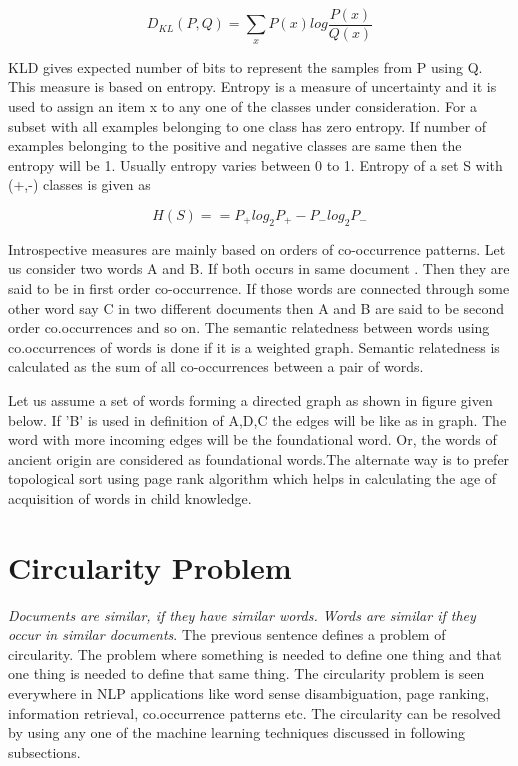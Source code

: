 \documentclass{bmcart}
\begin{document}
\begin{center}
\begin{equation}
D_{KL}(P,Q) = \sum_{x}P(x)log \frac{P(x)}{Q(x)} 
\end{equation}
\end{center}

KLD gives expected number of bits to represent the samples from P using Q. This measure is based on entropy. Entropy is a measure of uncertainty and it is used to assign an item x to any one of the classes under consideration. For a subset with all examples belonging to one class has zero entropy. If number of examples belonging  to the positive and negative classes are same then the entropy will be 1. Usually entropy varies between 0 to 1. Entropy of a set S with (+,-) classes is given as

\begin{center}
\begin{equation}
H(S)==P_{+}log_2P_{+} - P_{-}log_2P_{-}
\end{equation}
\label{eqn:entropy}
\end{center}

Introspective measures are mainly based on orders of co-occurrence patterns. 
Let us consider two words A and B. If both occurs in same document . Then they are said to be in first order co-occurrence. If those words are connected through some other word say C in two different documents then A and B are said to be second order co.occurrences and so on. The semantic relatedness between words using co.occurrences of words is done if it is a weighted graph. Semantic relatedness is calculated as the sum of all co-occurrences between a pair of words. 

Let us assume a set of words forming a directed graph as shown in figure given below. If 'B' is used in definition of A,D,C the edges will be like as in graph. The word with more incoming edges will be the foundational word. Or, the words of ancient origin are considered as foundational words.The alternate way is to prefer topological sort using page rank algorithm which helps in calculating the age of acquisition of words in child knowledge. 

\section{Circularity Problem}
\label{sec:circularity}
{\it Documents are similar, if they have similar words. Words are similar if they occur in similar documents}. The previous sentence defines a problem of circularity. The problem where something is needed to define one thing and that one thing is needed to define that same thing. The circularity problem is seen everywhere in NLP applications like word sense disambiguation, page ranking, information retrieval, co.occurrence patterns etc. The circularity can be resolved by using any one of the machine learning techniques discussed in following subsections. 
\end{document}
